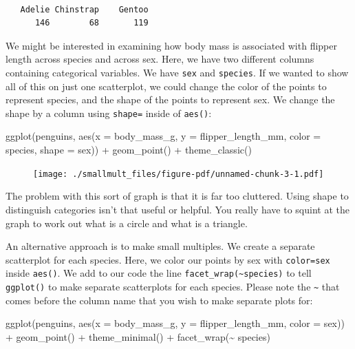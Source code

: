 \documentclass[
  letterpaper,
  DIV=11,
  numbers=noendperiod]{scrreprt}
\newenvironment{Shaded}{\begin{snugshade}}{\end{snugshade}}
\newcommand{\AttributeTok}[1]{\textcolor[rgb]{0.40,0.45,0.13}{#1}}
\newcommand{\FunctionTok}[1]{\textcolor[rgb]{0.28,0.35,0.67}{#1}}
\newcommand{\NormalTok}[1]{\textcolor[rgb]{0.00,0.23,0.31}{#1}}
\newcommand{\SpecialCharTok}[1]{\textcolor[rgb]{0.37,0.37,0.37}{#1}}
\begin{document}
\begin{verbatim}

   Adelie Chinstrap    Gentoo 
      146        68       119 
\end{verbatim}

We might be interested in examining how body mass is associated with
flipper length across species and across sex. Here, we have two
different columns containing categorical variables. We have \texttt{sex}
and \texttt{species}. If we wanted to show all of this on just one
scatterplot, we could change the color of the points to represent
species, and the shape of the points to represent sex. We change the
shape by a column using \texttt{shape=} inside of \texttt{aes()}:

\begin{Shaded}
\begin{Highlighting}[]
\FunctionTok{ggplot}\NormalTok{(penguins, }\FunctionTok{aes}\NormalTok{(}\AttributeTok{x =}\NormalTok{ body\_mass\_g,  }\AttributeTok{y =}\NormalTok{ flipper\_length\_mm, }
                     \AttributeTok{color =}\NormalTok{ species, }\AttributeTok{shape =}\NormalTok{ sex)) }\SpecialCharTok{+} 
  \FunctionTok{geom\_point}\NormalTok{() }\SpecialCharTok{+}
  \FunctionTok{theme\_classic}\NormalTok{()}
\end{Highlighting}
\end{Shaded}

\begin{figure}[H]

{\centering \texttt{[image: ./smallmult\_files/figure-pdf/unnamed-chunk-3-1.pdf]}

}

\end{figure}

The problem with this sort of graph is that it is far too cluttered.
Using shape to distinguish categories isn't that useful or helpful. You
really have to squint at the graph to work out what is a circle and what
is a triangle.

An alternative approach is to make small multiples. We create a separate
scatterplot for each species. Here, we color our points by sex with
\texttt{color=sex} inside \texttt{aes()}. We add to our code the line
\texttt{facet\_wrap(\textasciitilde{}species)} to tell \texttt{ggplot()}
to make separate scatterplots for each species. Please note the
\texttt{\textasciitilde{}} that comes before the column name that you
wish to make separate plots for:

\begin{Shaded}
\begin{Highlighting}[]
\FunctionTok{ggplot}\NormalTok{(penguins, }\FunctionTok{aes}\NormalTok{(}\AttributeTok{x =}\NormalTok{ body\_mass\_g,  }\AttributeTok{y =}\NormalTok{ flipper\_length\_mm, }\AttributeTok{color =}\NormalTok{ sex)) }\SpecialCharTok{+} 
  \FunctionTok{geom\_point}\NormalTok{() }\SpecialCharTok{+}
  \FunctionTok{theme\_minimal}\NormalTok{() }\SpecialCharTok{+}
  \FunctionTok{facet\_wrap}\NormalTok{(}\SpecialCharTok{\textasciitilde{}}\NormalTok{ species)}
\end{Highlighting}
\end{Shaded}
\end{document}
